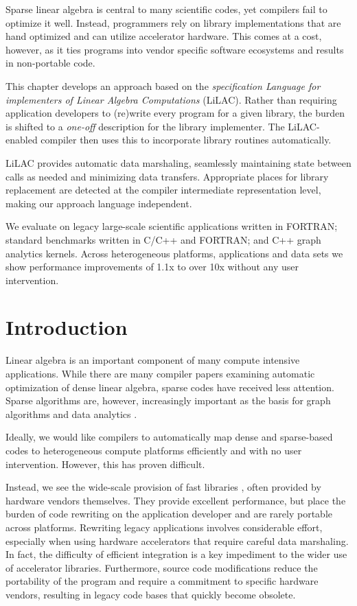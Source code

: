  
    Sparse linear algebra is central to many scientific codes, yet compilers
    fail to optimize it well.
    Instead, programmers rely on library implementations that are hand optimized
    and can utilize accelerator hardware.
    This comes at a cost, however, as it ties programs into vendor specific
    software ecosystems and results in non-portable code.

    This chapter develops an approach based on the {\em specification
    Language for implementers of Linear Algebra Computations} (LiLAC).
    Rather than requiring application developers to (re)write every program for
    a given library, the burden is shifted to a {\em one-off} description for
    the library implementer.
    The LiLAC-enabled compiler then uses this to incorporate library routines
    automatically.

    LiLAC provides automatic data marshaling, seamlessly maintaining state
    between calls as needed and minimizing data transfers.
    Appropriate places for library replacement are detected at the compiler
    intermediate representation level, making our approach language independent.

    We evaluate on legacy large-scale scientific applications written in FORTRAN;
    standard benchmarks written in C/C++ and FORTRAN; and C++ graph analytics kernels.
    Across heterogeneous platforms, applications and data sets we show performance
    improvements of 1.1x to over 10x without any user intervention.


\section{Introduction}

    Linear algebra is an important component of many compute intensive
    applications.
    While there are many compiler papers examining automatic optimization of
    dense linear algebra, sparse codes have received less attention. 
    Sparse algorithms are, however, increasingly important as the basis for
    graph algorithms and data analytics \cite{Kepner2015GraphsMA}.

Ideally, we would like compilers to automatically map dense and sparse-based
codes to heterogeneous compute platforms efficiently and with no user
intervention. However,  this has proven difficult.

Instead, we see the wide-scale provision of fast libraries
\cite{cusparse,clsparse,mkl}, often provided by hardware vendors themselves.
They provide excellent performance, but place the burden of code rewriting on
the application developer and are rarely portable across platforms.
Rewriting legacy applications involves considerable effort, especially when
using hardware accelerators that require careful data marshaling.
In fact, the difficulty of efficient integration is a key impediment to the
wider use of accelerator libraries.
Furthermore, source code modifications reduce the portability of the
program and require a commitment to specific hardware vendors, resulting in legacy
code bases that quickly become obsolete.

